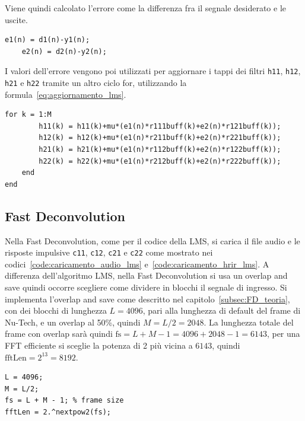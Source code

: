 \documentclass[12pt,a4paper,titlepage]{article}
\begin{document}
Viene quindi calcolato l'errore come la differenza fra il segnale desiderato e le uscite.

\begin{lstlisting}[label=code:calcolo_errore, caption=Calcolo dell'errore, captionpos=b]
    e1(n) = d1(n)-y1(n);
    e2(n) = d2(n)-y2(n);
\end{lstlisting}    


I valori dell'errore vengono poi utilizzati per aggiornare i tappi dei filtri \texttt{h11}, \texttt{h12}, \texttt{h21} e \texttt{h22} tramite un altro ciclo for, utilizzando la formula~\eqref{eq:aggiornamento_lms}.

\begin{lstlisting}[label=code:aggiornamento_filtro_lms, caption=Aggiornamento del filtro, captionpos=b]
    for k = 1:M
        h11(k) = h11(k)+mu*(e1(n)*r111buff(k)+e2(n)*r121buff(k));
        h12(k) = h12(k)+mu*(e1(n)*r211buff(k)+e2(n)*r221buff(k));
        h21(k) = h21(k)+mu*(e1(n)*r112buff(k)+e2(n)*r122buff(k));
        h22(k) = h22(k)+mu*(e1(n)*r212buff(k)+e2(n)*r222buff(k));
    end
end
\end{lstlisting}

\subsection{Fast Deconvolution}
\label{subsec:codice_matlab_fd}
Nella Fast Deconvolution, come per il codice della LMS, si carica il file audio e le risposte impulsive \texttt{c11}, \texttt{c12}, \texttt{c21} e \texttt{c22} come mostrato nei codici~\ref{code:caricamento_audio_lms} e~\ref{code:caricamento_hrir_lms}. A differenza dell'algoritmo LMS, nella Fast Deconvolution si usa un overlap and save quindi occorre scegliere come dividere in blocchi il segnale di ingresso. Si implementa l'overlap and save come descritto nel capitolo~\ref{subsec:FD_teoria}, con dei blocchi di lunghezza $L = 4096$, pari alla lunghezza di default del frame di Nu-Tech, e un overlap al 50\%, quindi $M = L/2 = 2048$. La lunghezza totale del frame con overlap sarà quindi $\text{fs} = L + M - 1 = 4096+2048-1 = 6143$, per una FFT efficiente si sceglie la potenza di 2 più vicina a $6143$, quindi $\text{fftLen} = 2^{13} = 8192$.

\begin{lstlisting}[label=code:parametri_ols, caption=Parametri overlap and save, captionpos=b]
L = 4096;
M = L/2;
fs = L + M - 1; % frame size
fftLen = 2.^nextpow2(fs);
\end{lstlisting}
\end{document}
